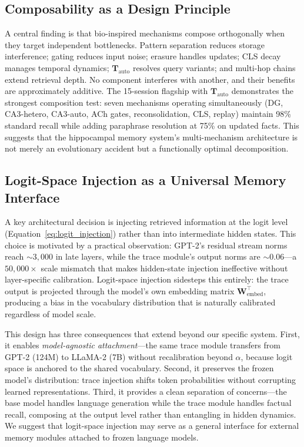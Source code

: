 \documentclass[11pt,a4paper]{article}
\begin{document}
\subsection{Composability as a Design Principle}

A central finding is that bio-inspired mechanisms compose orthogonally when they target independent bottlenecks. Pattern separation reduces storage interference; gating reduces input noise; erasure handles updates; CLS decay manages temporal dynamics; $\mathbf{T}_{\text{auto}}$ resolves query variants; and multi-hop chains extend retrieval depth. No component interferes with another, and their benefits are approximately additive. The 15-session flagship with $\mathbf{T}_{\text{auto}}$ demonstrates the strongest composition test: seven mechanisms operating simultaneously (DG, CA3-hetero, CA3-auto, ACh gates, reconsolidation, CLS, replay) maintain 98\% standard recall while adding paraphrase resolution at 75\% on updated facts. This suggests that the hippocampal memory system's multi-mechanism architecture is not merely an evolutionary accident but a functionally optimal decomposition.

\subsection{Logit-Space Injection as a Universal Memory Interface}

A key architectural decision is injecting retrieved information at the logit level (Equation~\ref{eq:logit_injection}) rather than into intermediate hidden states. This choice is motivated by a practical observation: GPT-2's residual stream norms reach ${\sim}3{,}000$ in late layers, while the trace module's output norms are ${\sim}0.06$---a $50{,}000\times$ scale mismatch that makes hidden-state injection ineffective without layer-specific calibration. Logit-space injection sidesteps this entirely: the trace output is projected through the model's own embedding matrix $\mathbf{W}_{\text{embed}}^\top$, producing a bias in the vocabulary distribution that is naturally calibrated regardless of model scale.

This design has three consequences that extend beyond our specific system. First, it enables \emph{model-agnostic attachment}---the same trace module transfers from GPT-2 (124M) to LLaMA-2 (7B) without recalibration beyond $\alpha$, because logit space is anchored to the shared vocabulary. Second, it preserves the frozen model's distribution: trace injection shifts token probabilities without corrupting learned representations. Third, it provides a clean separation of concerns---the base model handles language generation while the trace module handles factual recall, composing at the output level rather than entangling in hidden dynamics. We suggest that logit-space injection may serve as a general interface for external memory modules attached to frozen language models.
\end{document}
